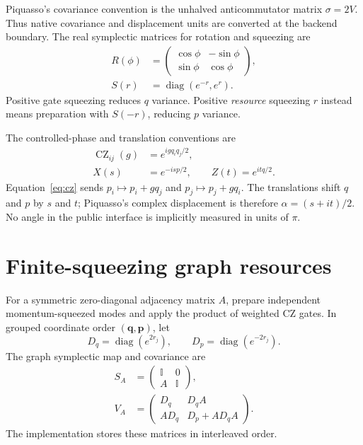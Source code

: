 \documentclass[a4paper,twocolumn,11pt,nopdfoutputerror]{quantumarticle}
\newcommand{\I}{\mathbb{I}}
\newcommand{\diag}{\operatorname{diag}}
\newcommand{\CZ}{\operatorname{CZ}}
\begin{document}
Piquasso's covariance convention is the unhalved anticommutator matrix
$\sigma=2V$. Thus native covariance and displacement units are converted at the
backend boundary. The real symplectic matrices for rotation and squeezing are
\begin{align}
 R(\phi)&=\begin{pmatrix}\cos\phi&-\sin\phi\\\sin\phi&\cos\phi\end{pmatrix},\\
 S(r)&=\diag(e^{-r},e^r).
\end{align}
Positive gate squeezing reduces $q$ variance. Positive \emph{resource} squeezing
$r$ instead means preparation with $S(-r)$, reducing $p$ variance.

The controlled-phase and translation conventions are
\begin{align}
 \CZ_{ij}(g)&=e^{igq_iq_j/2},\label{eq:cz}\\
 X(s)&=e^{-isp/2},\qquad Z(t)=e^{itq/2}.
\end{align}
Equation~\eqref{eq:cz} sends $p_i\mapsto p_i+gq_j$ and
$p_j\mapsto p_j+gq_i$. The translations shift $q$ and $p$ by $s$ and $t$;
Piquasso's complex displacement is therefore $\alpha=(s+it)/2$.
No angle in the public interface is implicitly measured in units of $\pi$.

\section{Finite-squeezing graph resources}

For a symmetric zero-diagonal adjacency matrix $A$, prepare independent
momentum-squeezed modes and apply the product of weighted CZ gates. In grouped
coordinate order $(\bm q,\bm p)$, let
\begin{equation}
 D_q=\diag(e^{2r_j}),\qquad D_p=\diag(e^{-2r_j}).
\end{equation}
The graph symplectic map and covariance are
\begin{align}
 S_A&=\begin{pmatrix}\I&0\\A&\I\end{pmatrix},\\
 V_A&=\begin{pmatrix}D_q&D_qA\\AD_q&D_p+AD_qA\end{pmatrix}.
 \label{eq:graphcov}
\end{align}
The implementation stores these matrices in interleaved order.
\end{document}
